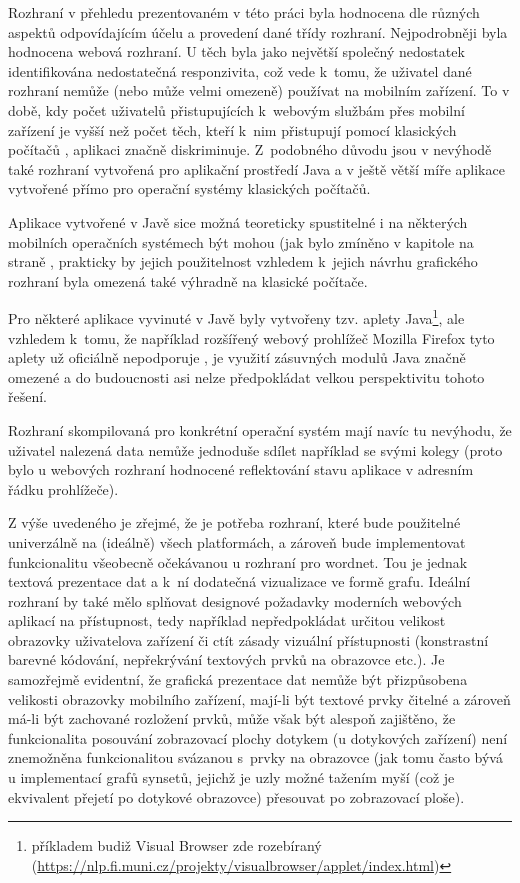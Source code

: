 \documentclass[a4paper, 11pt, oneside, showtrims]{book}
\newcommand{\itNameRef}[1]{\textit{\nameref{#1}}}
\begin{document}
			Rozhraní v přehledu prezentovaném v této práci byla hodnocena dle různých aspektů odpovídajícím účelu a provedení dané třídy rozhraní. Nejpodrobněji byla hodnocena webová rozhraní. U těch byla jako největší společný nedostatek identifikována nedostatečná responzivita, což vede k~tomu, že uživatel dané rozhraní nemůže (nebo může velmi omezeně) používat na mobilním zařízení. To v době, kdy počet uživatelů přistupujících k~webovým službám přes mobilní zařízení je vyšší než počet těch, kteří k~nim přistupují pomocí klasických počítačů \parencite{Heisler2016}, aplikaci značně diskriminuje. Z~podobného důvodu jsou v nevýhodě také rozhraní vytvořená pro aplikační prostředí Java a v ještě větší míře aplikace vytvořené přímo pro operační systémy klasických počítačů. 

			Aplikace vytvořené v Javě sice možná teoreticky spustitelné i na některých mobilních operačních systémech být mohou (jak bylo zmíněno v kapitole \itNameRef{cha:structhodnoc} na straně \pageref{cha:structhodnoc}, prakticky by jejich použitelnost vzhledem k~jejich návrhu grafického rozhraní byla omezená také výhradně na klasické počítače. 

			Pro některé aplikace vyvinuté v Javě byly vytvořeny tzv. aplety Java\footnote{příkladem budiž Visual Browser zde rozebíraný (\url{https://nlp.fi.muni.cz/projekty/visualbrowser/applet/index.html})}, ale vzhledem k~tomu, že například rozšířený webový prohlížeč Mozilla Firefox tyto aplety už oficiálně nepodporuje \parencite{MozzilaFoundation2017}, je využití zásuvných modulů Java značně omezené a do budoucnosti asi nelze předpokládat velkou perspektivitu tohoto řešení.

			Rozhraní skompilovaná pro konkrétní operační systém mají navíc tu nevýhodu, že uživatel nalezená data nemůže jednoduše sdílet například se svými kolegy (proto bylo u webových rozhraní hodnocené reflektování stavu aplikace v adresním řádku prohlížeče). 

			Z výše uvedeného je zřejmé, že je potřeba rozhraní, které bude použitelné univerzálně na (ideálně) všech platformách, a zároveň bude implementovat funkcionalitu všeobecně očekávanou u rozhraní pro wordnet. Tou je jednak textová prezentace dat a k~ní dodatečná vizualizace ve formě grafu. Ideální rozhraní by také mělo splňovat designové požadavky moderních webových aplikací na přístupnost, tedy například nepředpokládat určitou velikost obrazovky uživatelova zařízení či ctít zásady vizuální přístupnosti (konstrastní barevné kódování, nepřekrývání textových prvků na obrazovce etc.). Je samozřejmě evidentní, že grafická prezentace dat nemůže být přizpůsobena velikosti obrazovky mobilního zařízení, mají-li být textové prvky čitelné a zároveň má-li být zachované rozložení prvků, může však být alespoň zajištěno, že funkcionalita posouvání zobrazovací plochy dotykem (u dotykových zařízení) není znemožněna funkcionalitou svázanou s~prvky na obrazovce (jak tomu často bývá u implementací grafů synsetů, jejichž je uzly možné tažením myší (což je ekvivalent přejetí po dotykové obrazovce) přesouvat po zobrazovací ploše). 
\end{document}
